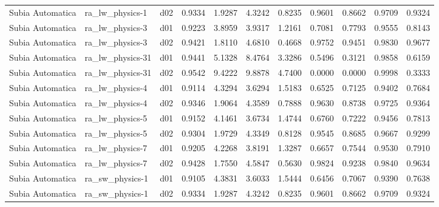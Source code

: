 \begin{longtable}{lllrrrrrrrr}
     Subia Automatica  &       ra\_lw\_physics-1 &     d02 &   0.9334 &   1.9287 &   4.3242 &       0.8235 &        0.9601 &       0.8662 &           0.9709 &  0.9324 \\
     Subia Automatica  &       ra\_lw\_physics-3 &     d01 &   0.9223 &   3.8959 &   3.9317 &       1.2161 &        0.7081 &       0.7793 &           0.9555 &  0.8143 \\
     Subia Automatica  &       ra\_lw\_physics-3 &     d02 &   0.9421 &   1.8110 &   4.6810 &       0.4668 &        0.9752 &       0.9451 &           0.9830 &  0.9677 \\
     Subia Automatica  &      ra\_lw\_physics-31 &     d01 &   0.9441 &   5.1328 &   8.4764 &       3.3286 &        0.5496 &       0.3121 &           0.9858 &  0.6159 \\
     Subia Automatica  &      ra\_lw\_physics-31 &     d02 &   0.9542 &   9.4222 &   9.8878 &       4.7400 &        0.0000 &       0.0000 &           0.9998 &  0.3333 \\
     Subia Automatica  &       ra\_lw\_physics-4 &     d01 &   0.9114 &   4.3294 &   3.6294 &       1.5183 &        0.6525 &       0.7125 &           0.9402 &  0.7684 \\
     Subia Automatica  &       ra\_lw\_physics-4 &     d02 &   0.9346 &   1.9064 &   4.3589 &       0.7888 &        0.9630 &       0.8738 &           0.9725 &  0.9364 \\
     Subia Automatica  &       ra\_lw\_physics-5 &     d01 &   0.9152 &   4.1461 &   3.6734 &       1.4744 &        0.6760 &       0.7222 &           0.9456 &  0.7813 \\
     Subia Automatica  &       ra\_lw\_physics-5 &     d02 &   0.9304 &   1.9729 &   4.3349 &       0.8128 &        0.9545 &       0.8685 &           0.9667 &  0.9299 \\
     Subia Automatica  &       ra\_lw\_physics-7 &     d01 &   0.9205 &   4.2268 &   3.8191 &       1.3287 &        0.6657 &       0.7544 &           0.9530 &  0.7910 \\
     Subia Automatica  &       ra\_lw\_physics-7 &     d02 &   0.9428 &   1.7550 &   4.5847 &       0.5630 &        0.9824 &       0.9238 &           0.9840 &  0.9634 \\
     Subia Automatica  &       ra\_sw\_physics-1 &     d01 &   0.9105 &   4.3831 &   3.6033 &       1.5444 &        0.6456 &       0.7067 &           0.9390 &  0.7638 \\
     Subia Automatica  &       ra\_sw\_physics-1 &     d02 &   0.9334 &   1.9287 &   4.3242 &       0.8235 &        0.9601 &       0.8662 &           0.9709 &  0.9324 \\

\end{longtable}
